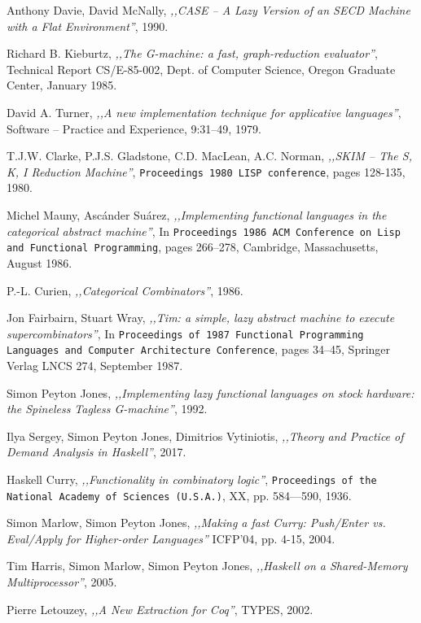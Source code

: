 \documentclass[en]{pracamgr}
\begin{document}
\begin{thebibliography}{99}
 Anthony Davie, David McNally, \textit{,,CASE -- A Lazy Version of an SECD Machine with a Flat Environment''}, 1990.

 Richard B. Kieburtz, \textit{,,The G-machine: a fast, graph-reduction evaluator''}, Technical Report CS/E-85-002, Dept. of Computer Science, Oregon Graduate Center, January 1985.

 David A. Turner, \textit{,,A new implementation technique for applicative languages''}, Software -- Practice and Experience, 9:31–49, 1979.

 T.J.W. Clarke, P.J.S. Gladstone, C.D. MacLean, A.C. Norman, \textit{,,SKIM -- The S, K, I Reduction Machine''}, \texttt{Proceedings 1980 LISP conference}, pages 128-135, 1980.

 Michel Mauny, Asc\'ander Su\'arez, \textit{,,Implementing functional languages in the categorical abstract machine''}, In \texttt{Proceedings 1986 ACM Conference on Lisp and Functional Programming}, pages 266–278, Cambridge, Massachusetts, August 1986.

 P.-L. Curien, \textit{,,Categorical Combinators''}, 1986.

 Jon Fairbairn, Stuart Wray, \textit{,,Tim: a simple, lazy abstract machine to execute supercombinators''},  In \texttt{Proceedings of 1987 Functional Programming Languages and Computer Architecture Conference}, pages 34–45, Springer Verlag LNCS 274, September 1987.

 Simon Peyton Jones, \textit{,,Implementing lazy functional languages on stock hardware: the Spineless Tagless G-machine''}, 1992.

 Ilya Sergey, Simon Peyton Jones, Dimitrios Vytiniotis, \textit{,,Theory and Practice of Demand Analysis in Haskell''}, 2017.

 Haskell Curry, \textit{,,Functionality in combinatory logic''}, \texttt{Proceedings
of the National Academy of Sciences (U.S.A.)}, XX, pp. 584—590, 1936.

 Simon Marlow, Simon Peyton Jones, \textit{,,Making a fast Curry: Push/Enter vs. Eval/Apply for Higher-order Languages''} ICFP'04, pp. 4-15, 2004.

 Tim Harris, Simon Marlow, Simon Peyton Jones, \textit{,,Haskell on a Shared-Memory Multiprocessor''}, 2005.

 Pierre Letouzey, \textit{,,A New Extraction for Coq''}, TYPES, 2002.

\end{thebibliography}
\end{document}
